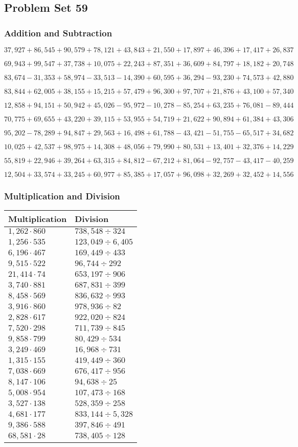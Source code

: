 \hypertarget{problem-set-59-3}{%
\subsection{Problem Set 59}\label{problem-set-59-3}}

\hypertarget{addition-and-subtraction-281}{%
\subsubsection{Addition and
Subtraction}\label{addition-and-subtraction-281}}

\(37,927+86,545+90,579+78,121+43,843+21,550+17,897+46,396+17,417+ 26,837\)

\(69,943+99,547+37,738+10,075+22,243+87,351+36,609+84,797+18,182+20,748\)

\(83,674-31,353+58,974-33,513-14,390+60,595+36,294-93,230+74,573+42,880\)

\(83,844+62,005+38,155+15,215+57,479+96,300+97,707+21,876+43,100+57,340\)

\(12,858+94,151+50,942+45,026-95,972-10,278-85,254+63,235+76,081-89,444\)

\(70,775+69,655+43,220+39,115+53,955+54,719+21,622+90,894+61,384+43,306\)

\(95,202-78,289+94,847+29,563+16,498+61,788-43,421-51,755-65,517+34,682\)

\(10,025+42,537+98,975+14,308+48,056+79,990+80,531+13,401+32,376+14,229\)

\(55,819+22,946+39,264+63,315+84,812-67,212+81,064-92,757-43,417-40,259\)

\(12,504+33,574+33,245+60,977+85,385+17,057+96,098+32,269+32,452+14,556\)

\hypertarget{multiplication-and-division-280}{%
\subsubsection{Multiplication and
Division}\label{multiplication-and-division-280}}

\begin{longtable}[]{@{}ll@{}}
\toprule
Multiplication & Division\tabularnewline
\midrule
\endhead
\(1,262\cdot860\) & \(738,548÷324\)\tabularnewline
\(1,256\cdot535\) & \(123,049÷6,405\)\tabularnewline
\(6,196\cdot467\) & \(169,449÷433\)\tabularnewline
\(9,515\cdot522\) & \(96,744÷292\)\tabularnewline
\(21,414\cdot74\) & \(653,197÷906\)\tabularnewline
\(3,740\cdot881\) & \(687,831÷399\)\tabularnewline
\(8,458\cdot569\) & \(836,632÷993\)\tabularnewline
\(3,916\cdot860\) & \(978,936÷82\)\tabularnewline
\(2,828\cdot617\) & \(922,020÷824\)\tabularnewline
\(7,520\cdot298\) & \(711,739÷845\)\tabularnewline
\(9,858\cdot799\) & \(80,429÷534\)\tabularnewline
\(3,249\cdot469\) & \(16,968÷731\)\tabularnewline
\(1,315\cdot155\) & \(419,449÷360\)\tabularnewline
\(7,038\cdot669\) & \(676,417÷956\)\tabularnewline
\(8,147\cdot106\) & \(94,638÷25\)\tabularnewline
\(5,008\cdot954\) & \(107,473÷168\)\tabularnewline
\(3,527\cdot138\) & \(528,359÷258\)\tabularnewline
\(4,681\cdot177\) & \(833,144÷5,328\)\tabularnewline
\(9,386\cdot588\) & \(397,846÷491\)\tabularnewline
\(68,581\cdot28\) & \(738,405÷128\)\tabularnewline
\bottomrule
\end{longtable}

